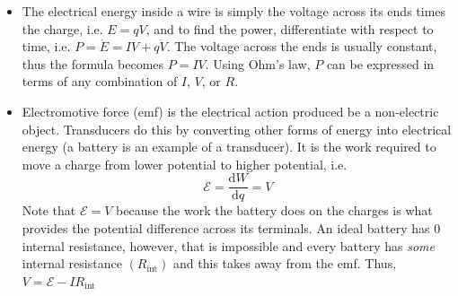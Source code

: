 \documentclass{scrartcl}
\begin{document}
\begin{itemize}
        \item The electrical energy inside a wire is simply the voltage across its ends times the charge, i.e. $E=qV$, and to find the power, differentiate with respect to time, i.e. $P=\dot E=IV+q\dot V$. The voltage across the ends is usually constant, thus the formula becomes $P=IV$. Using Ohm's law, $P$ can be expressed in terms of any combination of $I$, $V$, or $R$.
        \item Electromotive force (emf) is the electrical action produced be a non-electric object. Transducers do this by converting other forms of energy into electrical energy (a battery is an example of a transducer). It is the work required to move a charge from lower potential to higher potential, i.e. \[\mathcal E=\frac{\mathrm dW}{\mathrm dq}=V\] Note that $\mathcal E=V$ because the work the battery does on the charges is what provides the potential difference across its terminals. An ideal battery has 0 internal resistance, however, that is impossible and every battery has \textit{some} internal resistance $\left(R_\text{int}\right)$ and this takes away from the emf. Thus, $\boxed{V=\mathcal E-IR_\text{int}}$
    \end{itemize}
\end{document}
